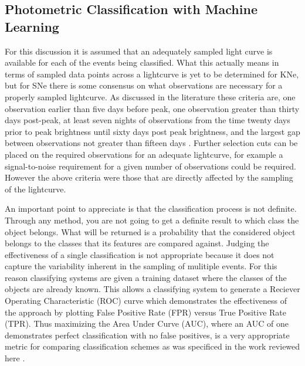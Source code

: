 \documentclass[12pt]{article}
\begin{document}
\subsection{Photometric Classification with Machine Learning} %
For this discussion it is assumed that an adequately sampled light curve is available for each of the events being classified. What this actually means in terms of sampled data points across a lightcurve is yet to be determined for KNe, but for SNe there is some consensus on what observations are necessary for a properly sampled lightcurve. As discussed in the literature these criteria are, one observation earlier than five days before peak, one observation greater than thirty days post-peak, at least seven nights of observations from the time twenty days prior to peak brightness until sixty days post peak brightness, and the largest gap between observations not greater than fifteen days \citep{LSSTScienceCollaboration2017}. Further selection cuts can be placed on the required observations for an adequate lightcurve, for example a signal-to-noise requirement for a given number of observations could be required. However the above criteria were those that are directly affected by the sampling of the lightcurve.\par
An important point to appreciate is that the classification process is not definite. Through any method, you are not going to get a definite result to which class the object belongs. What will be returned is a probability that the considered object belongs to the classes that its features are compared against. Judging the effectiveness of a single classification is not appropriate because it does not capture the variability inherent in the sampling of mulitiple events. For this reason classifying systems are given a training dataset where the classes of the objects are already known. This allows a classifying system to generate a Reciever Operating Characteristic (ROC) curve which demonstrates the effectiveness of the approach by plotting False Positive Rate (FPR) versus True Positive Rate (TPR). Thus maximizing the Area Under Curve (AUC), where an AUC of one demonstrates perfect classification with no false positives, is a very appropriate metric for comparing classification schemes as was specificed in the work reviewed here \citep{Lochner2016}.\par
\end{document}
